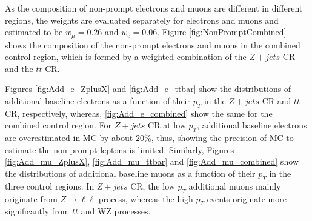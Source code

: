 As the composition of non-prompt electrons and muons are different in different regions, the weights are evaluated separately for electrons and muons and estimated to be $w_{\mu} = 0.26$ and $w_{e} = 0.06$. Figure \ref{fig:NonPromptCombined} shows the composition of the non-prompt electrons and muons in the combined control region, which is formed by a weighted combination of the $Z+jets$ CR and the $t\bar{t}$ CR.

Figures \ref{fig:Add_e_ZplusX} and \ref{fig:Add_e_ttbar} show the distributions of additional baseline electrons as a function of their $p_{T}$ in the $Z+jets$ CR and $t\bar{t}$ CR, respectively, whereas, \ref{fig:Add_e_combined} show the same for the combined control region. For $Z+jets$ CR at low $p_{T}$, additional baseline electrons are overestimated in MC by about $20\%$, thus, showing the precision of MC to estimate the non-prompt leptons is limited. Similarly, Figures \ref{fig:Add_mu_ZplusX}, \ref{fig:Add_mu_ttbar} and \ref{fig:Add_mu_combined} show the distributions of additional baseline muons as a function of their $p_{T}$ in the three control regions. In $Z+jets$ CR, the low $p_{T}$ additional muons mainly originate from $Z\rightarrow \ell \ell$ process, whereas the high $p_{T}$ events originate more significantly from $t\bar{t}$ and WZ processes.

